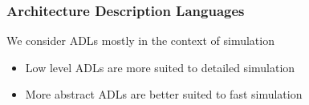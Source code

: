 \begin{frame}
\frametitle{Architecture Description Languages}

We consider ADLs mostly in the context of simulation
\begin{itemize}
	\item Low level ADLs are more suited to detailed simulation
	\item More abstract ADLs are better suited to fast simulation
\end{itemize}

\end{frame}
